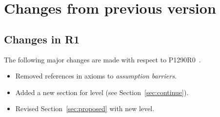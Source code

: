 \section{Changes from previous version}

\subsection{Changes in R1}

The following major changes are made with respect to P1290R0~\cite{p1290r0}.

\begin{itemize}
  \item Removed references in axioms to \emph{assumption barriers}.
  \item Added a new section for  level (see Section~\ref{sec:continue}).
  \item Revised Section~\ref{sec:proposed} with new  level.
\end{itemize}
